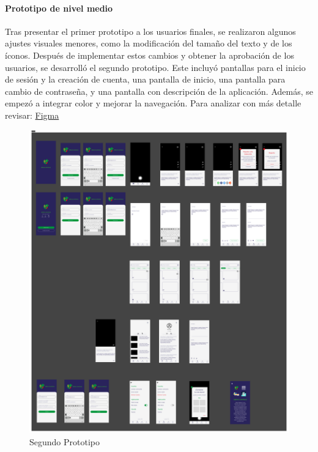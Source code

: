 \paragraph{Prototipo de nivel medio}

Tras presentar el primer prototipo a los usuarios finales, se realizaron algunos ajustes visuales menores, como la modificación del tamaño del texto y de los íconos. Después de implementar estos cambios y obtener la aprobación de los usuarios, se desarrolló el segundo prototipo. Este incluyó pantallas para el inicio de sesión y la creación de cuenta, una pantalla de inicio, una pantalla para cambio de contraseña, y una pantalla con descripción de la aplicación. Además, se empezó a integrar color y mejorar la navegación. Para analizar con más detalle revisar: \href{https://www.figma.com/design/d7NOw36r1mUY7qDBIveJ2K/Se%C3%B1as-Chapinas?node-id=275-15737&node-type=CANVAS&t=ua1wEji5yxVRI6ES-0}{Figma} 


\begin{figure} [H]
    \centering
    \includegraphics[width=1\linewidth]{figuras/segundo_prototipo.png}
    \caption{Segundo Prototipo}
    \label{fig:segundo_prototipo}
\end{figure}

